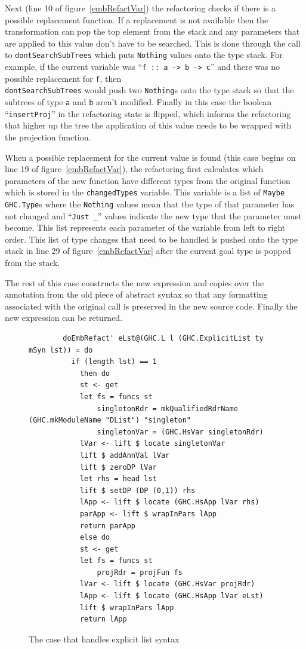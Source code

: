 Next (line 10 of figure~\ref{embRefactVar}) the refactoring checks if there is a possible replacement function. If a replacement is not available then the transformation can pop the top element from the stack and any parameters that are applied to this value don't have to be searched. This is done through the call to \texttt{dontSearchSubTrees} which puts \texttt{Nothing} values onto the type stack. For example, if the current variable was ``\texttt{f :: a -> b -> c}'' and there was no possible replacement for \texttt{f}, then \\ \texttt{dontSearchSubTrees} would push two \texttt{Nothing}s onto the type stack so that the subtrees of type \texttt{a} and \texttt{b} aren't modified. Finally in this case the boolean ``\texttt{insertProj}'' in the refactoring state is flipped, which informs the refactoring that higher up the tree the application of this value needs to be wrapped with the projection function. 

When a possible replacement for the current value is found (this case begins on line 19 of figure~\ref{embRefactVar}), the refactoring first calculates which parameters of the new function have different types from the original function which is stored in the \texttt{changedTypes} variable. This variable is a list of \texttt{Maybe GHC.Type}s where the \texttt{Nothing} values mean that the type of that parameter has not changed and ``\texttt{Just \_}'' values indicate the new type that the parameter must become. This list represents each parameter of the variable from left to right order. This list of type changes that need to be handled is pushed onto the type stack in line 29 of figure~\ref{embRefactVar} after the current goal type is popped from the stack. 

The rest of this case constructs the new expression and copies over the annotation from the old piece of abstract syntax so that any formatting associated with the original call is preserved in the new source code. Finally the new expression can be returned.

\begin{figure}[t]
\begin{lstlisting}
        doEmbRefact' eLst@(GHC.L l (GHC.ExplicitList ty mSyn lst)) = do
          if (length lst) == 1
            then do
            st <- get
            let fs = funcs st
                singletonRdr = mkQualifiedRdrName (GHC.mkModuleName "DList") "singleton"
                singletonVar = (GHC.HsVar singletonRdr)
            lVar <- lift $ locate singletonVar
            lift $ addAnnVal lVar
            lift $ zeroDP lVar
            let rhs = head lst
            lift $ setDP (DP (0,1)) rhs
            lApp <- lift $ locate (GHC.HsApp lVar rhs)
            parApp <- lift $ wrapInPars lApp
            return parApp
            else do
            st <- get
            let fs = funcs st
                projRdr = projFun fs
            lVar <- lift $ locate (GHC.HsVar projRdr)
            lApp <- lift $ locate (GHC.HsApp lVar eLst)
            lift $ wrapInPars lApp
            return lApp
\end{lstlisting}
\caption{The case that handles explicit list syntax}
\label{embRefactExpLst}
\end{figure}

